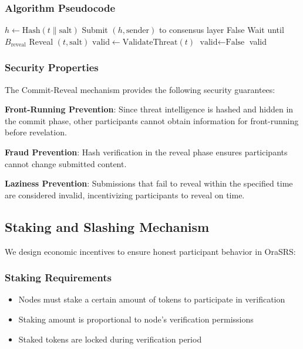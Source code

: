 \documentclass[12pt]{article}
\begin{document}
\subsubsection{Algorithm Pseudocode}
\begin{algorithm}
\caption{Commit-Reveal Threat Intelligence Verification}
\begin{algorithmic}[1]
\STATE $h \gets \text{Hash}(t \parallel \text{salt})$
\STATE Submit $(h, \text{sender})$ to consensus layer
    \STATE \RETURN False
\ENDIF
\STATE Wait until $B_{\text{reveal}}$
\STATE Reveal $(t, \text{salt})$
    \STATE $\text{valid} \gets \text{ValidateThreat}(t)$
\ELSE
    \STATE $\text{valid} \gets \text{False}$
\ENDIF
\STATE \RETURN valid
\end{algorithmic}
\end{algorithm}

\subsubsection{Security Properties}
The Commit-Reveal mechanism provides the following security guarantees:

\textbf{Front-Running Prevention}: Since threat intelligence is hashed and hidden in the commit phase, other participants cannot obtain information for front-running before revelation.

\textbf{Fraud Prevention}: Hash verification in the reveal phase ensures participants cannot change submitted content.

\textbf{Laziness Prevention}: Submissions that fail to reveal within the specified time are considered invalid, incentivizing participants to reveal on time.

\subsection{Staking and Slashing Mechanism}

We design economic incentives to ensure honest participant behavior in OraSRS:

\subsubsection{Staking Requirements}
\begin{itemize}
\item Nodes must stake a certain amount of tokens to participate in verification
\item Staking amount is proportional to node's verification permissions
\item Staked tokens are locked during verification period
\end{itemize}
\end{document}
